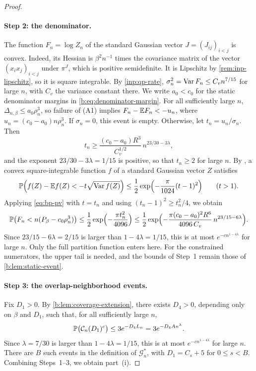 \begin{proof}
\paragraph{Step 2: the denominator.} The function $F_n=\log Z_n$ of the standard Gaussian vector $J=(J_{ij})_{i<j}$ is convex. Indeed, its Hessian is $\beta^2n^{-1}$ times the covariance matrix of the vector $(x_ix_j)_{i<j}$ under $\pi^J$, which is positive semidefinite. It is Lipschitz by \cref{rem:inp-lipschitz}, so it is square integrable. By \cref{inp:qp-rate}, $\sigma_n^2=\operatorname{Var} F_n\le C_vn^{7/15}$ for large $n$, with $C_v$ the variance constant there. We write $a_0<c_0$ for the static denominator margins in \eqref{b:eq:denominator-margin}. For all sufficiently large $n$, $\Delta_{n,\beta}\le a_0\rho_n^3$, so failure of (A1) implies $F_n-\mathbb E F_n<-u_n$, where $u_n=(c_0-a_0)n\rho_n^3$. If $\sigma_n=0$, this event is empty. Otherwise, let $t_n=u_n/\sigma_n$. Then
\[
 t_n\ge\frac{(c_0-a_0)R^3}{C_v^{1/2}}\,n^{23/30-3\lambda},
\]
and the exponent $23/30-3\lambda=1/15$ is positive, so that $t_n\ge2$ for large $n$. By \cite[Theorem~2.1 and Remark~2.4(3), (2.4)]{paouris-valettas-2018}, a convex square-integrable function $f$ of a standard Gaussian vector $Z$ satisfies
\begin{equation}\label{eq:bp-pv}
 \mathbb P\Bigl(f(Z)-\mathbb E f(Z)<-t\sqrt{\operatorname{Var} f(Z)}\Bigr)\le\frac12\exp\Bigl(-\frac{\pi}{1024}(t-1)^2\Bigr)\qquad(t>1).
\end{equation}
Applying \eqref{eq:bp-pv} with $t=t_n$ and using $(t_n-1)^2\ge t_n^2/4$, we obtain
\[
 \mathbb P\bigl(F_n<n(P_\beta-c_0\rho_n^3)\bigr)\le\frac12\exp\Bigl(-\frac{\pi t_n^2}{4096}\Bigr)
 \le\frac12\exp\Bigl(-\frac{\pi(c_0-a_0)^2R^6}{4096\,C_v}\,n^{23/15-6\lambda}\Bigr).
\]
Since $23/15-6\lambda=2/15$ is larger than $1-4\lambda=1/15$, this is at most $e^{-cn^{1-4\lambda}}$ for large $n$. Only the full partition function enters here. For the constrained numerators, the upper tail is needed, and the bounds of Step~1 remain those of \cref{b:lem:static-event}.

\paragraph{Step 3: the overlap-neighborhood events.} Fix $D_1>0$. By \cref{b:lem:coverage-extension}, there exists $D_4>0$, depending only on $\beta$ and $D_1$, such that, for all sufficiently large $n$,
\[
 \mathbb P\bigl(\mathcal C_n(D_1)^c\bigr)\le3e^{-D_4L_n}=3e^{-D_4An^\lambda}.
\]
Since $\lambda=7/30$ is larger than $1-4\lambda=1/15$, this is at most $e^{-cn^{1-4\lambda}}$ for large $n$. There are $B$ such events in the definition of $\mathcal G_n^*$, with $D_1=C_s+5$ for $0\le s<B$. Combining Steps~1--3, we obtain part~(i).


\end{proof}
